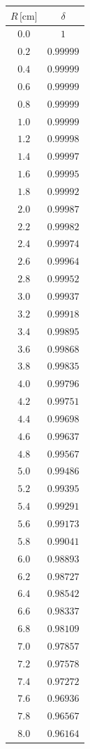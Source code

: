 \documentclass[]{article}
\begin{document}
\begin{table}[H]
    \centering

\begin{tabular}{||c|c||}
    \hline
    $R \, \text{[cm]} $ & $ \delta $\\
    \hline\hline

    $0.0$ & $1$ \\\hline
    $0.2$ & $0.99999$ \\\hline
    $0.4$ & $0.99999$ \\\hline
    $0.6$ & $0.99999$ \\\hline
    $0.8$ & $0.99999$ \\\hline
    $1.0$ & $0.99999$ \\\hline
    $1.2$ & $0.99998$ \\\hline
    $1.4$ & $0.99997$ \\\hline
    $1.6$ & $0.99995$ \\\hline
    $1.8$ & $0.99992$ \\\hline
    $2.0$ & $0.99987$ \\\hline
    $2.2$ & $0.99982$ \\\hline
    $2.4$ & $0.99974$ \\\hline
    $2.6$ & $0.99964$ \\\hline
    $2.8$ & $0.99952$ \\\hline
    $3.0$ & $0.99937$ \\\hline
    $3.2$ & $0.99918$ \\\hline
    $3.4$ & $0.99895$ \\\hline
    $3.6$ & $0.99868$ \\\hline
    $3.8$ & $0.99835$ \\\hline
    $4.0$ & $0.99796$ \\\hline
    $4.2$ & $0.99751$ \\\hline
    $4.4$ & $0.99698$ \\\hline
    $4.6$ & $0.99637$ \\\hline
    $4.8$ & $0.99567$ \\\hline
    $5.0$ & $0.99486$ \\\hline
    $5.2$ & $0.99395$ \\\hline
    $5.4$ & $0.99291$ \\\hline
    $5.6$ & $0.99173$ \\\hline
    $5.8$ & $0.99041$ \\\hline
    $6.0$ & $0.98893$ \\\hline
    $6.2$ & $0.98727$ \\\hline
    $6.4$ & $0.98542$ \\\hline
    $6.6$ & $0.98337$ \\\hline
    $6.8$ & $0.98109$ \\\hline
    $7.0$ & $0.97857$ \\\hline
    $7.2$ & $0.97578$ \\\hline
    $7.4$ & $0.97272$ \\\hline
    $7.6$ & $0.96936$ \\\hline
    $7.8$ & $0.96567$ \\\hline
    $8.0$ & $0.96164$ \\\hline


\end{tabular}
\end{table}
\end{document}
